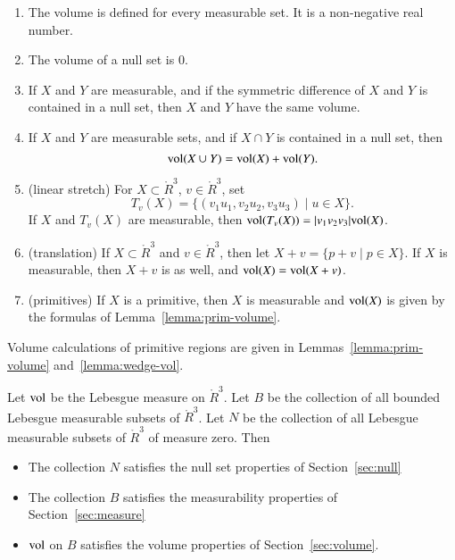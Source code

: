 \begin{enumerate}%
 \item The volume is defined for every measurable set.  It is
    a non-negative real number.
 \item The volume of a null set is $0$.
 \item If $X$ and $Y$ are  measurable, and if
 the symmetric difference of
 $X$ and $Y$ is contained in a null set, then 
    $X$ and $Y$ have the same volume.
 \item If $X$ and $Y$ are measurable sets, and if $X\cap
 Y$ is contained in a null set, then
    $$
    {\operatorname{vol}}(X\cup Y) = {\operatorname{vol}}(X) + {\operatorname{vol}}(Y).
    $$
  \item (linear stretch) For $X\subset \ring{R}^3$, $v\in\ring{R}^3$, 
    set 
      $$
      T_v(X) = \{ (v_1u_1,v_2u_2,v_3u_3) \mid u\in X\}.
      $$
    If $X$ and $T_v(X)$ are measurable, then
     ${\operatorname{vol}}(T_v(X)) = |v_1v_2v_3|{\operatorname{vol}}(X)$.
  \item (translation) If $X\subset \ring{R}^3$ and $v\in\ring{R}^3$, then let
    $X+v = \{p + v\mid p\in X\}$.  If $X$ is measurable, then $X+v$ is
    as well, and ${\operatorname{vol}}(X) = {\operatorname{vol}}(X+v)$.
  \item (primitives) If $X$ is a primitive, then $X$ is measurable
    and ${\operatorname{vol}}(X)$ is given by the formulas of Lemma~\ref{lemma:prim-volume}.
\end{enumerate}
Volume calculations of primitive regions are given in 
Lemmas~\ref{lemma:prim-volume} and~\ref{lemma:wedge-vol}.

\begin{lemma}
Let ${\operatorname{vol}}$ be the Lebesgue measure
on $\ring{R}^3$. Let $B$ be the collection of all bounded Lebesgue
measurable subsets of $\ring{R}^3$.  Let $N$ be the collection of all
Lebesgue measurable subsets of $\ring{R}^3$ of measure zero.
Then
\begin{itemize}
\item  The collection $N$ satisfies the null set properties of Section~\ref{sec:null}
\item The collection $B$ satisfies the measurability properties of Section~\ref{sec:measure}
\item  ${\operatorname{vol}}$ on $B$ satisfies the volume properties of Section~\ref{sec:volume}.  
\end{itemize}
\end{lemma}


